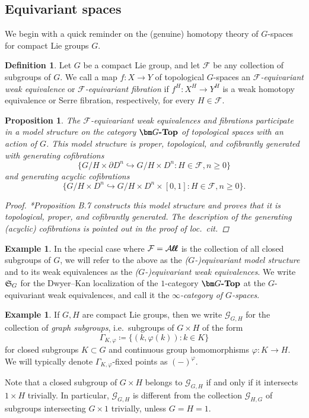 \documentclass[reqno]{memo-l}
\theoremstyle{mythm}
\newtheorem{prop}[thm]{Proposition}
\theoremstyle{definition}
\newtheorem{ex}[thm]{Example}
\newtheorem{definition}[thm]{Definition}
\numberwithin{equation}{section}
\newcommand{\Aa}{{\mathcal{A}}}
\newcommand{\Ff}{{\mathcal{F}}}
\renewcommand{\phi}{\varphi}
\newcommand{\cat}[1]{\textbf{\textup{#1}}}
\newcommand{\bigAll}{\hbox{\hfuzz=20pt\hbox{$\mathcal A\kern-.3pt$}\setbox0=\hbox{$\ell\kern-.75pt\ell$}\hbox to 0pt{\hfuzz=8pt\kern-.075pt\unhcopy0}\hbox to 0pt{\hfuzz=8pt\kern.075pt\unhcopy0}\box0\kern.05pt}}
\newcommand{\smallAll}{\Aa\kern-.3pt\ell\kern-.6pt\ell}
\newcommand{\All}{\mathchoice{\bigAll}{\bigAll}{\smallAll}{\smallAll}}
\newcommand{\myS}{{{\mathfrak S\kern-.4pt}}}
\begin{document}
\subsection{Equivariant spaces} We begin with a quick reminder on the (genuine) homotopy theory of $G$-spaces for compact Lie groups $G$.

\begin{definition}
    Let $G$ be a compact Lie group, and let $\Ff$ be any collection of subgroups of $G$. We call a map $f\colon X\to Y$ of topological $G$-spaces an \emph{$\mathcal F$-equivariant weak equivalence} or \emph{$\Ff$-equivariant fibration} if $f^H\colon X^H\to Y^H$ is a weak homotopy equivalence or Serre fibration, respectively, for every $H\in\Ff$.
\end{definition}

\begin{prop}\label{prop:equiv-model-structure}
    The $\Ff$-equivariant weak equivalences and fibrations participate in a model structure on the category $\cat{$\bm G$-Top}$ of topological spaces with an action of $G$. This model structure is proper, topological, and cofibrantly generated with generating cofibrations
    \[
        \{G/H\times\partial D^n\hookrightarrow G/H\times D^n : H\in\Ff,n\ge0\}
    \]
    and generating acyclic cofibrations
    \[
        \{G/H\times D^n\hookrightarrow G/H\times D^n\times[0,1] : H\in\Ff,n\ge0\}.
    \]
    \begin{proof}
        \cite{schwede2018global}*{Proposition B.7} constructs this model structure and proves that it is topological, proper, and cofibrantly generated. The description of the generating (acyclic) cofibrations is pointed out in the proof of \emph{loc.\ cit.}
    \end{proof}
\end{prop}

\begin{ex}\label{ex:G-spaces}
    In the special case where $\Ff=\All$ is the collection of all closed subgroups of $G$, we will refer to the above as the \emph{($G$-)equivariant model structure} and to its weak equivalences as the \emph{($G$-)equivariant weak equivalences}. We write $\myS_G$ for the Dwyer--Kan localization of the $1$-category $\cat{$\bm G$-Top}$ at the $G$-equivariant weak equivalences, and call it the \emph{$\infty$-category of $G$-spaces}.
\end{ex}

\begin{ex}
    If $G,H$ are compact Lie groups, then we write $\mathcal G_{G,H}$ for the collection of \emph{graph subgroups}, i.e.~subgroups of $G\times H$ of the form \[\Gamma_{K,\phi}\coloneqq\{(k,\phi(k)):k\in K\}\] for closed subgroups $K\subset G$ and continuous group homomorphisms $\phi\colon K\to H$. We will typically denote $\Gamma_{K,\phi}$-fixed points as $(-)^\phi$.

    Note that a closed subgroup of $G\times H$ belongs to $\mathcal G_{G,H}$ if and only if it intersects $1\times H$ trivially. In particular, $\mathcal G_{G,H}$ is different from the collection $\mathcal G_{H,G}$ of subgroups intersecting $G\times 1$ trivially, unless $G=H=1$.
\end{ex}
\end{document}
